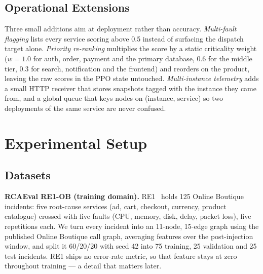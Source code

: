 \documentclass[conference,a4paper]{IEEEtran}
\begin{document}
\subsection{Operational Extensions}
Three small additions aim at deployment rather than accuracy. \emph{Multi-fault flagging} lists every service scoring above 0.5 instead of surfacing the dispatch target alone. \emph{Priority re-ranking} multiplies the score by a static criticality weight ($w=1.0$ for auth, order, payment and the primary database, $0.6$ for the middle tier, $0.3$ for search, notification and the frontend) and reorders on the product, leaving the raw scores in the PPO state untouched. \emph{Multi-instance telemetry} adds a small HTTP receiver that stores snapshots tagged with the instance they came from, and a global queue that keys nodes on (instance, service) so two deployments of the same service are never confused.

\section{Experimental Setup}
\subsection{Datasets}
\textbf{RCAEval RE1-OB (training domain).} RE1~\cite{pham2025rcaeval} holds 125 Online Boutique~\cite{googleob} incidents: five root-cause services (ad, cart, checkout, currency, product catalogue) crossed with five faults (CPU, memory, disk, delay, packet loss), five repetitions each. We turn every incident into an 11-node, 15-edge graph using the published Online Boutique call graph, averaging features over the post-injection window, and split it 60/20/20 with seed 42 into 75 training, 25 validation and 25 test incidents. RE1 ships no error-rate metric, so that feature stays at zero throughout training --- a detail that matters later.
\end{document}
